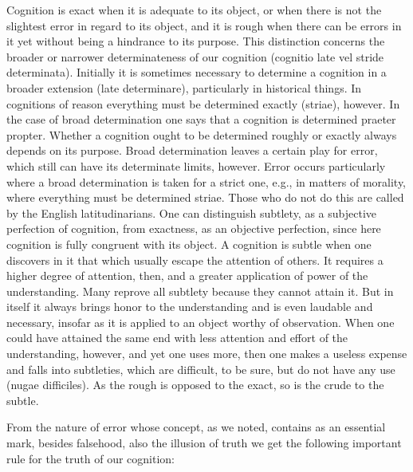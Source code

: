     Cognition is exact when it is adequate to its object, or
    when there is not the slightest error in regard to its object,
    and it is rough when there can be errors in it yet
    without being a hindrance to its purpose.
    This distinction concerns the broader or narrower determinateness
    of our cognition (cognitio late vel stride determinata).
    Initially it is sometimes necessary to determine a cognition
    in a broader extension (late determinare),
    particularly in historical things.
    In cognitions of reason everything must be
    determined exactly (striae), however.
    In the case of broad determination
    one says that a cognition is determined praeter propter.
    Whether a cognition ought to be determined roughly or exactly
    always depends on its purpose.
    Broad determination leaves a certain play for error,
    which still can have its determinate limits, however.
    Error occurs particularly where a broad determination
    is  taken for a strict one,
    e.g., in matters of morality,
    where everything must be determined striae.
    Those who do not do this are called by the English latitudinarians.
    One can distinguish subtlety, as a subjective perfection of cognition,
    from exactness, as an objective perfection,
    since here cognition is fully congruent with its object.
    A cognition is subtle when one discovers in it
    that which usually escape the attention of others.
    It requires a higher degree of attention, then,
    and a greater application of power of the understanding.
    Many reprove all subtlety because they cannot attain it.
    But in itself it always brings honor to the understanding
    and is even laudable and necessary,
    insofar as it is applied to an object worthy of observation.
    When one could have attained the same end
    with less attention and effort of the understanding, however,
    and yet one uses more, then one makes a useless expense
    and falls into subtleties, which are difficult, to be sure,
    but do not have any use (nugae difficiles).
    As the rough is opposed to the exact,
     so is the crude to the subtle.

From the nature of error whose concept, as we noted,
contains as an essential mark, besides falsehood,
also the illusion of truth
we get the following important rule
for the truth of our cognition:

